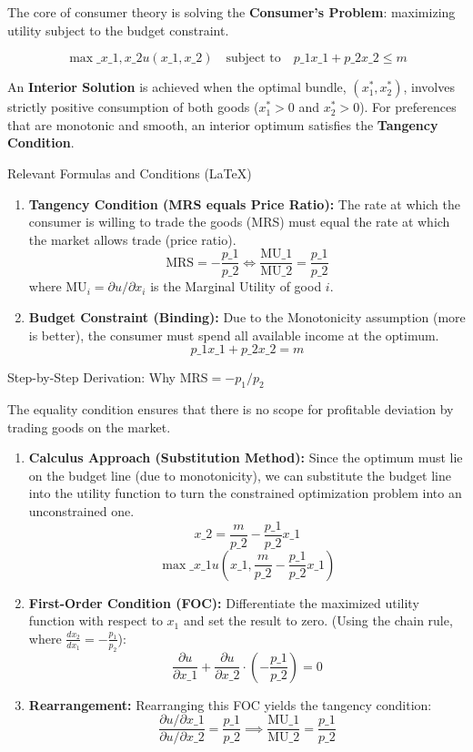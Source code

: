 \documentclass{article}
\begin{document}
The core of consumer theory is solving the \textbf{Consumer's Problem}: maximizing utility subject to the budget constraint.

\[\max\_{x\_1, x\_2} u(x\_1, x\_2) \quad \text{subject to} \quad p\_1 x\_1 + p\_2 x\_2 \leq m\]

An \textbf{Interior Solution} is achieved when the optimal bundle, $(x_1^*, x_2^*)$, involves strictly positive consumption of both goods ($x_1^* > 0$ and $x_2^* > 0$). For preferences that are monotonic and smooth, an interior optimum satisfies the \textbf{Tangency Condition}.

\noindent Relevant Formulas and Conditions (LaTeX)
\begin{enumerate}
    \item \textbf{Tangency Condition (MRS equals Price Ratio):} The rate at which the consumer is willing to trade the goods (MRS) must equal the rate at which the market allows trade (price ratio).
    \[\text{MRS} = -\frac{p\_1}{p\_2} \iff \frac{\text{MU}\_1}{\text{MU}\_2} = \frac{p\_1}{p\_2}\]
    where $\text{MU}_i = \partial u / \partial x_i$ is the Marginal Utility of good $i$.

    \item \textbf{Budget Constraint (Binding):} Due to the Monotonicity assumption (more is better), the consumer must spend all available income at the optimum.
    \[p\_1 x\_1 + p\_2 x\_2 = m\]
\end{enumerate}

\noindent Step-by-Step Derivation: Why $\text{MRS} = -p_1/p_2$

The equality condition ensures that there is no scope for profitable deviation by trading goods on the market.
\begin{enumerate}
    \item \textbf{Calculus Approach (Substitution Method):} Since the optimum must lie on the budget line (due to monotonicity), we can substitute the budget line into the utility function to turn the constrained optimization problem into an unconstrained one.
    \[x\_2 = \frac{m}{p\_2} - \frac{p\_1}{p\_2} x\_1\]
    \[\max\_{x\_1} u\left(x\_1, \frac{m}{p\_2} - \frac{p\_1}{p\_2} x\_1\right)\]

    \item \textbf{First-Order Condition (FOC):} Differentiate the maximized utility function with respect to $x_1$ and set the result to zero. (Using the chain rule, where $\frac{dx_2}{dx_1} = -\frac{p_1}{p_2}$):
    \[\frac{\partial u}{\partial x\_1} + \frac{\partial u}{\partial x\_2} \cdot \left( -\frac{p\_1}{p\_2} \right) = 0\]

    \item \textbf{Rearrangement:} Rearranging this FOC yields the tangency condition:
    \[\frac{\partial u / \partial x\_1}{\partial u / \partial x\_2} = \frac{p\_1}{p\_2} \implies \frac{\text{MU}\_1}{\text{MU}\_2} = \frac{p\_1}{p\_2}\]
\end{enumerate}
\end{document}
